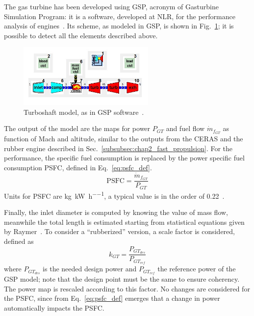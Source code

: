 The gas turbine has been developed using GSP, acronym of Gasturbine Simulation Program: it is a software, developed at NLR, for the performance analysis of engines~\cite{bib:gsp, bib:gsp_website}. 
Its scheme, as modeled in GSP, is shown in Fig.~\ref{fig:tshaft_gsp}; it is possible to detect all the elements described above. 
\begin{figure}[!h]
	\centering
	\includegraphics[keepaspectratio, width=0.6\textwidth]{images/chap3/tshaft_gsp.jpg}
	\caption{Turboshaft model, as in GSP software~\cite{bib:gsp_website}.}
	\label{fig:tshaft_gsp}
\end{figure}

The output of the model are the maps for power $P_{GT}$ and fuel flow $\dot{m}_{f_{GT}}$ as function of Mach and altitude, similar to the outputs from the CERAS and the rubber engine described in Sec.~\ref{subsubsec:chap2_fast_propulsion}. 
For the performance, the specific fuel consumption is replaced by the power specific fuel consumption PSFC, defined in Eq.~\eqref{eq:psfc_def}.
\begin{equation}
	\label{eq:psfc_def}
	\textrm{PSFC} = \frac{\dot{m}_{f_{GT}}}{P_{GT}}
\end{equation}
Units for PSFC are \si{\kilogram\per\kilo\watt\per\hour}, a typical value is in the order of 0.22~\cite{bib:burguburu}. 

Finally, the inlet diameter is computed by knowing the value of mass flow, meanwhile the total length is estimated starting from statistical equations given by Raymer~\cite{bib:raymer}.  
To consider a ``rubberized'' version, a scale factor is considered, defined as
\begin{equation}
	\label{eq:tshaft_scale_factor}
	k_{GT} = \frac{P_{GT_{des}}}{P_{GT_{ref}}}
\end{equation}
where $P_{GT_{des}}$ is the needed design power and $P_{GT_{ref}}$ the reference power of the GSP model; note that the design point must be the same to ensure coherency. 
The power map is rescaled according to this factor. 
No changes are considered for the PSFC, since from Eq.~\eqref{eq:psfc_def} emerges that a change in power automatically impacts the PSFC. 

